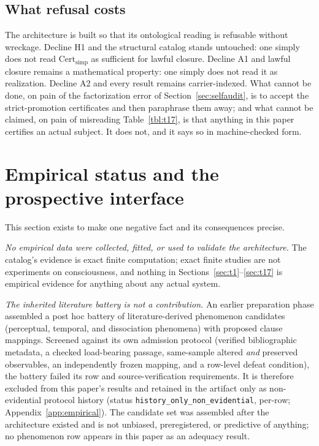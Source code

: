 \documentclass[11pt]{article}
\newcommand{\Certsimp}{\mathrm{Cert}_{\mathrm{simp}}}
\theoremstyle{definition}
\begin{document}
\subsection{What refusal costs}

The architecture is built so that its ontological reading is refusable
without wreckage. Decline H1 and the structural catalog stands untouched:
one simply does not read $\Certsimp$ as sufficient for lawful closure.
Decline A1 and lawful closure remains a mathematical property: one simply
does not read it as realization. Decline A2 and every result remains
carrier-indexed. What cannot be done, on pain of the factorization error of
Section~\ref{sec:selfaudit}, is to accept the strict-promotion certificates
and then paraphrase them away; and what cannot be claimed, on pain of
misreading Table~\ref{tbl:t17}, is that anything in this paper certifies an
actual subject. It does not, and it says so in machine-checked form.

 \section{Empirical status and the prospective interface}
\label{sec:empirical}


This section exists to make one negative fact and its consequences precise.

\emph{No empirical data were collected, fitted, or used to validate the
architecture.} The catalog's evidence is exact finite computation; exact
finite studies are not experiments on consciousness, and nothing in
Sections~\ref{sec:t1}--\ref{sec:t17} is empirical evidence for anything about
any actual system.

\emph{The inherited literature battery is not a contribution.} An earlier
preparation phase assembled a post hoc battery of literature-derived
phenomenon candidates (perceptual, temporal, and dissociation phenomena) with
proposed clause mappings. Screened against its own admission protocol
(verified bibliographic metadata, a checked load-bearing passage, same-sample
altered \emph{and} preserved observables, an independently frozen mapping,
and a row-level defeat condition), the battery failed its row and
source-verification requirements. It is therefore excluded from this paper's
results and retained in the artifact only as non-evidential protocol history
(status \texttt{history\_only\_non\_evidential}, per-row;
Appendix~\ref{app:empirical}). The candidate set was assembled after the
architecture existed and is not unbiased, preregistered, or predictive of
anything; no phenomenon row appears in this paper as an adequacy result.
\end{document}
